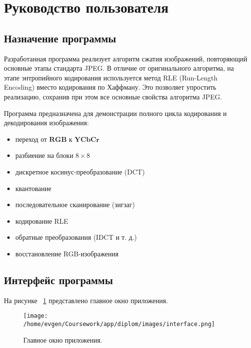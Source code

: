 \section{Руководство пользователя}

\subsection{Назначение программы}

Разработанная программа реализует алгоритм сжатия изображений, повторяющий основные этапы стандарта JPEG. 
В отличие от оригинального алгоритма, на этапе энтропийного кодирования используется метод RLE (Run-Length Encoding) 
вместо кодирования по Хаффману. 
Это позволяет упростить реализацию, сохранив при этом все основные свойства алгоритма JPEG.

Программа предназначена для демонстрации полного цикла кодирования и декодирования изображения:

\begin{itemize}
    \item переход от $\textbf{RGB}$ к $\textbf{YCbCr}$
    \item разбиение на блоки $8 \times 8$
    \item дискретное косинус-преобразование (DCT)
    \item квантование
    \item последовательное сканирование (зигзаг)
    \item кодирование RLE
    \item обратные преобразования (IDCT и т. д.)
    \item восстановление RGB-изображения

\end{itemize}



\clearpage
\subsection{Интерфейс программы}

На рисунке ~\ref{fig:interface} представлено главное окно приложения.

\begin{figure}[h!]
    \centering
    \texttt{[image: /home/evgen/Coursework/app/diplom/images/interface.png]}
    \caption{Главное окно приложения.}
    \label{fig:interface}
\end{figure}



